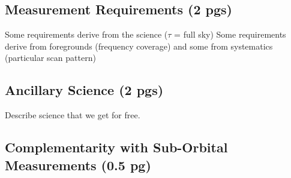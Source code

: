\documentclass[12pt]{article}
\begin{document}
\subsection{Measurement Requirements (2 pgs)}

Some requirements derive from the science ($\tau$ = full sky)
Some requirements derive from foregrounds (frequency coverage) and some from systematics (particular scan pattern)

\subsection{Ancillary Science (2 pgs)} 

Describe science that we get for free. 

\subsection{Complementarity with Sub-Orbital Measurements (0.5 pg)} 



 
%   

%  

%   

%   
\end{document}
